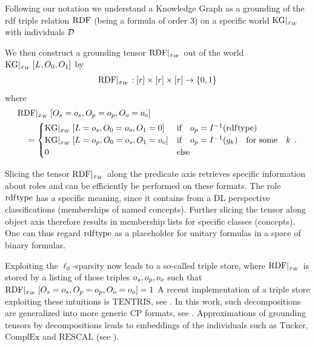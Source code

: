 Following our notation we understand a Knowledge Graph as a grounding of the rdf triple relation $\mathrm{RDF}$ (being a formula of order 3) on a specific world $\mathrm{KG}|_{x_{W}}$ with individuals $\mathcal{D}$

We then construct a grounding tensor ${\mathrm{RDF}}|_{x_{W}}$ out of the world $\mathrm{KG}|_{x_{W}}\left[L,O_{0},O_{1}\right]$ by
\begin{align*}
    {\mathrm{RDF}}|_{x_{W}} : [r] \times [r] \times [r] \rightarrow \{0,1\}
\end{align*}
where
\begin{align*}
    &{\mathrm{RDF}}|_{x_{W}}\left[O_{s}=o_{s}, O_{p}=o_{p}, O_{o}=o_{o}\right] \\
    &\quad =
    \begin{cases}
        \mathrm{KG}|_{x_{W}}\left[L=o_{s},O_{0}=o_{o},O_{1}=0\right]
        & \text{if}\quad o_{p} = I^{-1}(\mathrm{rdf}\mathrm{type}) \\
        \mathrm{KG}|_{x_{W}}\left[L=o_{p},O_{0}=o_{s},O_{1}=o_{o}\right]
        & \text{if}\quad o_{p} = I^{-1}(g_{k}) \quad \text{for some} \quad k \\
        0  \quad & \text{else}
    \end{cases} \, .
\end{align*}


Slicing the tensor ${\mathrm{RDF}}|_{x_{W}}$ along the predicate axis retrieves specific information about roles and can be efficiently be performed on these formats.
The role $\mathrm{rdf}\mathrm{type}$ has a specific meaning, since it contains from a DL perspective classifications (memberships of named concepts).
Further slicing the tensor along object axis therefore results in membership lists for specific classes (concepts).
One can thus regard $\mathrm{rdf}\mathrm{type}$ as a placeholder for unitary formulas in a space of binary formulas.

Exploiting the $\ell_0$-sparsity now leads to a so-called triple store, where ${\mathrm{RDF}}|_{x_{W}}$ is stored by a listing of those triples $o_{s},o_{p},o_{o}$ such that ${\mathrm{RDF}}|_{x_{W}}\left[O_{s}=o_{s}, O_{p}=o_{p}, O_{o}=o_{o}\right]=1$
A recent implementation of a triple store exploiting these intuitions is $\mathrm{TENTRIS}$, see \cite{bigerl_tentris_2020}.
In this work, such decompositions are generalized into more generic CP formats, see .
Approximations of grounding tensors by decompositions leads to embeddings of the individuals such as $\mathrm{Tucker}$, $\mathrm{ComplEx}$ and $\mathrm{RESCAL}$ (see \cite{nickel_review_2016}).

